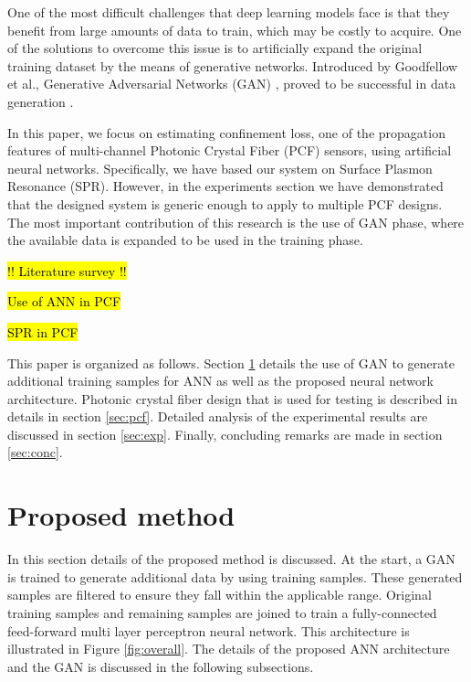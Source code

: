 \documentclass[draft, 10pt]{IEEEtran}
\begin{document}
One of the most difficult challenges that deep learning models face is that they benefit from large amounts of data to train, which may be costly to acquire. One of the solutions to overcome this issue is to artificially expand the original training dataset by the means of generative networks. Introduced by Goodfellow et al., Generative Adversarial Networks (GAN) \cite{goodfellow2014generative}, proved to be successful in data generation \cite{schlegl2017unsupervised, zheng2017unlabeled, frid2018synthetic, tanaka2019data, perez2017effectiveness}.

In this paper, we focus on estimating confinement loss, one of the propagation features of multi-channel Photonic Crystal Fiber (PCF) sensors, using artificial neural networks. Specifically, we have based our system on Surface Plasmon Resonance (SPR). However, in the experiments section we have demonstrated that the designed system is generic enough to apply to multiple PCF designs. The most important contribution of this research is the use of GAN phase, where the available data is expanded to be used in the training phase.


\hl{!! Literature survey !!}

\hl{Use of ANN in PCF}

\hl{SPR in PCF}

This paper is organized as follows. Section \ref{sec:prop} details the use of GAN to generate additional training samples for ANN as well as the proposed neural network architecture. Photonic crystal fiber design that is used for testing is described in details in section \ref{sec:pcf}. Detailed analysis of the experimental results are discussed in section \ref{sec:exp}. Finally, concluding remarks are made in section \ref{sec:conc}.

\section{Proposed method}
\label{sec:prop}

In this section details of the proposed method is discussed. At the start, a GAN is trained to generate additional data by using training samples. These generated samples are filtered to ensure they fall within the applicable range. Original training samples and remaining samples are joined to train a fully-connected feed-forward multi layer perceptron neural network. This architecture is illustrated in Figure \ref{fig:overall}. The details of the proposed ANN architecture and the GAN is discussed in the following subsections.
\end{document}
